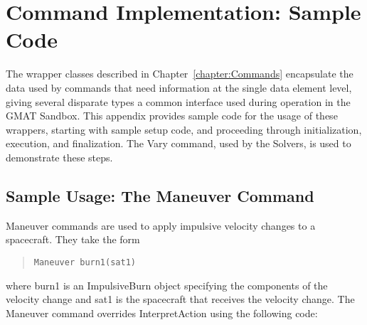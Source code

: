 \chapter{\label{chapter:CommandWrapperExample}Command Implementation: Sample
Code}

The wrapper classes described in Chapter~\ref{chapter:Commands} encapsulate the data used by
commands that need information at the single data element level, giving several disparate types a
common interface used during operation in the GMAT Sandbox.  This appendix provides sample code for
the usage of these wrappers, starting with sample setup code, and proceeding through
initialization, execution, and finalization.  The Vary command, used by the Solvers, is used to
demonstrate these steps.

\section{Sample Usage: The Maneuver Command}

Maneuver commands are used to apply impulsive velocity changes to a spacecraft.  They take the form

\begin{quote}
\begin{verbatim}
Maneuver burn1(sat1)
\end{verbatim}
\end{quote}

\noindent where burn1 is an ImpulsiveBurn object specifying the components of the velocity change
and sat1 is the spacecraft that receives the velocity change.  The Maneuver command overrides
InterpretAction using the following code:

